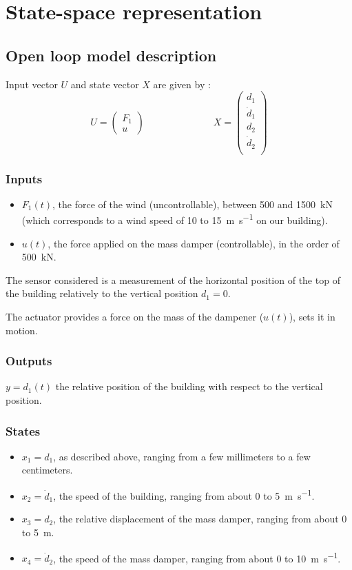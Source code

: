 \section{State-space representation}\label{state-space}

\subsection{Open loop model description}
Input vector $U$ and state vector $X$ are given by :
$$
U = \begin{pmatrix}
    F_1 \\
    u
\end{pmatrix}
\hspace{3cm}
X = \begin{pmatrix}
    d_1 \\
    \dot d_1 \\
    d_2 \\ 
    \dot d_2 \\
\end{pmatrix}
$$

\subsubsection{Inputs}
\begin{itemize}
    \item $F_1(t)$, the force of the wind (uncontrollable), between \num{500} and \SI{1500}{\kilo\newton} (which corresponds to a wind speed of \num{10} to \SI{15}{\meter\per\second} on our building).
    \item $u(t)$, the force applied on the mass damper (controllable), in the order of \SI{500}{\kilo\newton}.
\end{itemize}
The sensor considered is a measurement of the horizontal position of the top of the building relatively to the vertical position $d_1 = 0$.\par
The actuator provides a force on the mass of the dampener ($u(t)$), sets it in motion.

\subsubsection{Outputs}
$y = d_1(t)$ the relative position of the building with respect to the vertical position.

\subsubsection{States}
\begin{itemize}
    \item $x_1 = d_1$, as described above, ranging from a few millimeters to a few centimeters.
    \item $x_2 = \dot d_1$, the speed of the building, ranging from about \num{0} to \SI{5}{\meter\per\second}.
    \item $x_3 = d_2$, the relative displacement of the mass damper, ranging from about \num{0} to \SI{5}{\meter}.
    \item $x_4 = \dot d_2$, the speed of the mass damper, ranging from about \num{0} to \SI{10}{\meter\per\second}.
\end{itemize}

